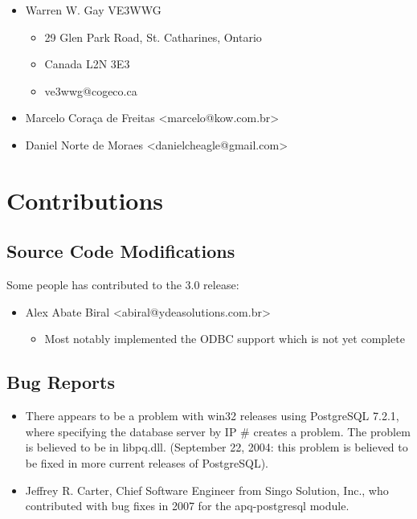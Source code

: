\documentclass[english,letterpaper]{book}
\begin{document}
\begin{itemize}
\item Warren W. Gay VE3WWG
	\begin{itemize}
		\item 29 Glen Park Road, St. Catharines, Ontario
		\item Canada L2N 3E3
		\item ve3wwg@cogeco.ca
	\end{itemize}
	\item Marcelo Cora\c ca de Freitas <marcelo@kow.com.br>
	\item Daniel Norte de Moraes <danielcheagle@gmail.com> 
\end{itemize}


\section*{Contributions}

\subsection*{Source Code Modifications}

Some people has contributed to the 3.0 release:
\begin{itemize}
	\item Alex Abate Biral <abiral@ydeasolutions.com.br>
		\begin{itemize}
			\item Most notably implemented the ODBC support which is not yet complete
		\end{itemize}
\end{itemize}

\subsection*{Bug Reports}

\begin{itemize}
\item There appears to be a problem with win32 releases using PostgreSQL
7.2.1, where specifying the database server by IP \# creates a problem.
The problem is believed to be in libpq.dll. (September 22, 2004: this
problem is believed to be fixed in more current releases of PostgreSQL).
\item Jeffrey R. Carter, Chief Software Engineer from Singo Solution, Inc., 
who contributed with bug fixes in 2007 for the apq-postgresql module.
\end{itemize}
\end{document}
